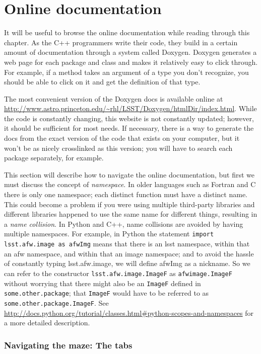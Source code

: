 \documentclass{book}
\begin{document}
\section{Online documentation}

It will be useful to browse the online documentation while reading
through this chapter.  As the C++ programmers write their code, they
build in a certain amount of documentation through a system called
Doxygen.  Doxygen generates a web page for each package and class and
makes it relatively easy to click through.  For example, if a method
takes an argument of a type you don't recognize, you should be able to
click on it and get the definition of that type.

The most convenient version of the Doxygen docs is available online at
\url{http://www.astro.princeton.edu/~rhl/LSST/Doxygen/htmlDir/index.html}.
While the code is constantly changing, this website is not constantly
updated; however, it should be sufficient for most needs.  If necessary,
there is a way to generate the docs from the exact version of the code that
exists on your computer, but it won't be as nicely crosslinked as this
version; you will have to search each package separately, for example.

This section will describe how to navigate the online documentation,
but first we must discuss the concept of {\it namespace}.  In older
languages such as Fortran and C there is only one namespace; each
distinct function must have a distinct name.  This could become a
problem if you were using multiple third-party libraries and different
libraries happened to use the same name for different things,
resulting in a {\it name collision}.  In Python and C++, name
collisions are avoided by having multiple namespaces.  For example, in
Python the statement \texttt{import lsst.afw.image as afwImg} means
that there is an lsst namespace, within that an afw namespace, and
within that an image namespace; and to avoid the hassle of constantly
typing lsst.afw.image, we will define afwImg as a nickname.  So we can
refer to the constructor \texttt{lsst.afw.image.ImageF} as \texttt{afwimage.ImageF}
without worrying that there might also be an \texttt{ImageF} defined
in \texttt{some.other.package}; that \texttt{ImageF} would have to be
referred to as \texttt{some.other.package.ImageF}.  See
\url{http://docs.python.org/tutorial/classes.html#python-scopes-and-namespaces}
for a more detailed description.


\subsubsection{Navigating the maze:  The tabs}
\end{document}
